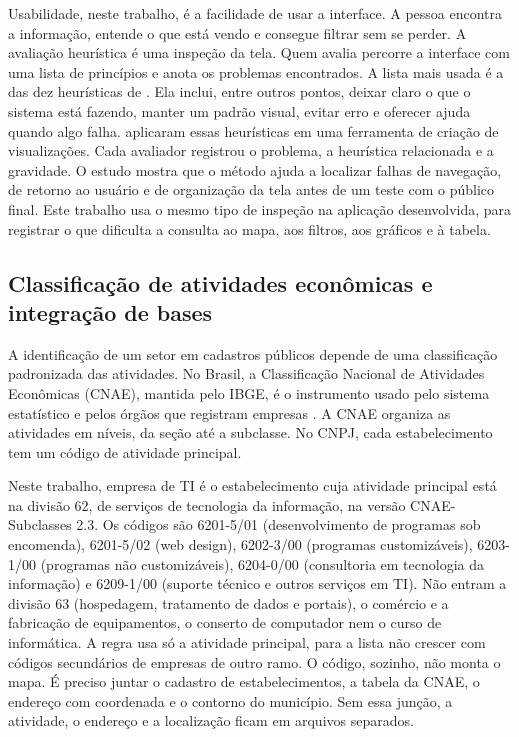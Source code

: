 Usabilidade, neste trabalho, é a facilidade de usar a interface.
A pessoa encontra a informação, entende o que está vendo e consegue filtrar sem se perder.
A avaliação heurística é uma inspeção da tela.
Quem avalia percorre a interface com uma lista de princípios e anota os problemas encontrados.
A lista mais usada é a das dez heurísticas de .
Ela inclui, entre outros pontos, deixar claro o que o sistema está fazendo, manter um padrão visual, evitar erro e oferecer ajuda quando algo falha.
 aplicaram essas heurísticas em uma ferramenta de criação de visualizações.
Cada avaliador registrou o problema, a heurística relacionada e a gravidade.
O estudo mostra que o método ajuda a localizar falhas de navegação, de retorno ao usuário e de organização da tela antes de um teste com o público final.
Este trabalho usa o mesmo tipo de inspeção na aplicação desenvolvida, para registrar o que dificulta a consulta ao mapa, aos filtros, aos gráficos e à tabela.

\subsection{Classificação de atividades econômicas e integração de bases}

A identificação de um setor em cadastros públicos depende de uma classificação padronizada das atividades.
No Brasil, a Classificação Nacional de Atividades Econômicas (CNAE), mantida pelo IBGE, é o instrumento usado pelo sistema estatístico e pelos órgãos que registram empresas \cite{ibge2020}.
A CNAE organiza as atividades em níveis, da seção até a subclasse.
No CNPJ, cada estabelecimento tem um código de atividade principal.

Neste trabalho, empresa de TI é o estabelecimento cuja atividade principal está na divisão 62, de serviços de tecnologia da informação, na versão CNAE-Subclasses 2.3.
Os códigos são 6201-5/01 (desenvolvimento de programas sob encomenda), 6201-5/02 (web design), 6202-3/00 (programas customizáveis), 6203-1/00 (programas não customizáveis), 6204-0/00 (consultoria em tecnologia da informação) e 6209-1/00 (suporte técnico e outros serviços em TI).
Não entram a divisão 63 (hospedagem, tratamento de dados e portais), o comércio e a fabricação de equipamentos, o conserto de computador nem o curso de informática.
A regra usa só a atividade principal, para a lista não crescer com códigos secundários de empresas de outro ramo.
O código, sozinho, não monta o mapa.
É preciso juntar o cadastro de estabelecimentos, a tabela da CNAE, o endereço com coordenada e o contorno do município.
Sem essa junção, a atividade, o endereço e a localização ficam em arquivos separados.

